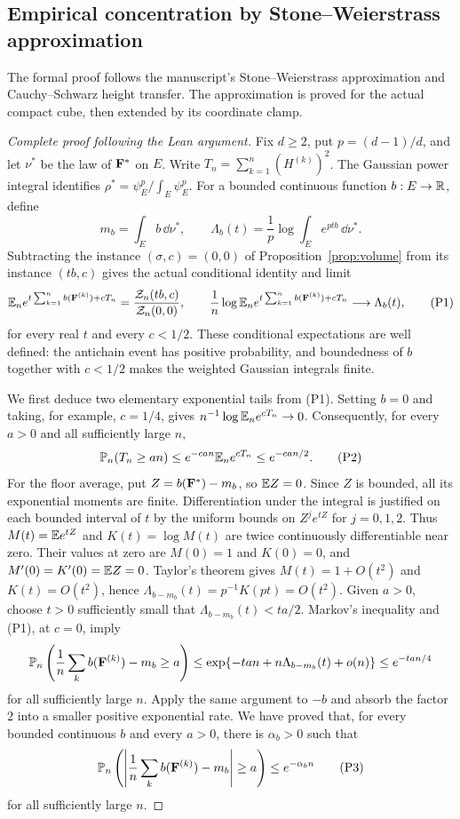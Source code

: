 
\subsection{Empirical concentration by Stone--Weierstrass approximation}
\label{leanproof:ANT-2-1}

The formal proof follows the manuscript's Stone--Weierstrass
approximation and Cauchy--Schwarz height transfer. The approximation is
proved for the actual compact cube, then extended by its coordinate clamp.

\begin{proof}[Complete proof following the Lean argument]
Fix $d\ge2$, put $p=(d-1)/d$, and let $\nu^\ast$ be the law of
$\mathbf F^\ast$ on $E$. Write $T_n=\sum_{k=1}^n(H^{(k)})^2$.
The Gaussian power integral identifies
$\rho^\ast=\psi_E^p/\int_E\psi_E^p$.
For a bounded continuous function $b:E\to\mathbb R$, define
\[
 m_b=\int_E b\,\dd\nu^\ast,
 \qquad
 \Lambda_b(t)=\frac1p\log\int_E e^{ptb}\,\dd\nu^\ast.
\]
Subtracting the instance $(\sigma,c)=(0,0)$ of
Proposition~\ref{prop:volume} from its instance $(tb,c)$ gives the actual
conditional identity and limit
\[
 \mathbb E_n e^{t\sum_{k=1}^n b(\mathbf F^{(k)})+cT_n}
   =\frac{\mathcal Z_n(tb,c)}{\mathcal Z_n(0,0)},
 \qquad
 \frac1n\log\mathbb E_n
 e^{t\sum_{k=1}^n b(\mathbf F^{(k)})+cT_n}
 \longrightarrow\Lambda_b(t),                 \tag{P1}
\]
for every real $t$ and every $c<1/2$. These conditional expectations are
well defined: the antichain event has positive probability, and boundedness
of $b$ together with $c<1/2$ makes the weighted Gaussian integrals finite.

We first deduce two elementary exponential tails from (P1). Setting $b=0$
and taking, for example, $c=1/4$, gives
$n^{-1}\log\mathbb E_n e^{cT_n}\to0$. Consequently, for every $a>0$ and all
sufficiently large $n$,
\[
 \mathbb P_n(T_n\ge an)
 \le e^{-can}\mathbb E_n e^{cT_n}
 \le e^{-can/2}.                              \tag{P2}
\]
For the floor average, put $Z=b(\mathbf F^\ast)-m_b$, so $\mathbb E Z=0$. Since $Z$ is
bounded, all its exponential moments are finite. Differentiation under
the integral is justified on each bounded interval of $t$ by the
uniform bounds on $Z^j e^{tZ}$ for $j=0,1,2$. Thus $M(t)=\mathbb E e^{tZ}$
and $K(t)=\log M(t)$ are twice continuously differentiable near zero.
Their values at zero are $M(0)=1$ and $K(0)=0$, and
$M'(0)=K'(0)=\mathbb E Z=0$. Taylor's theorem gives
$M(t)=1+O(t^2)$ and $K(t)=O(t^2)$, hence
$\Lambda_{b-m_b}(t)=p^{-1}K(pt)=O(t^2)$.
Given $a>0$, choose $t>0$ sufficiently small that
$\Lambda_{b-m_b}(t)<ta/2$. Markov's inequality and (P1), at $c=0$, imply
\[
 \mathbb P_n\left(\frac1n\sum_k b(\mathbf F^{(k)})-m_b\ge a\right)
 \le \exp\{-tan+n\Lambda_{b-m_b}(t)+o(n)\}
 \le e^{-tan/4}
\]
for all sufficiently large $n$. Apply the same argument to $-b$ and
absorb the factor $2$ into a smaller positive exponential rate. We have
proved that, for every bounded continuous $b$ and every $a>0$, there is
$\alpha_b>0$ such that
\[
 \mathbb P_n\left(\left|\frac1n\sum_k b(\mathbf F^{(k)})-m_b\right|\ge a\right)
 \le e^{-\alpha_b n}                          \tag{P3}
\]
for all sufficiently large $n$.


\end{proof}
